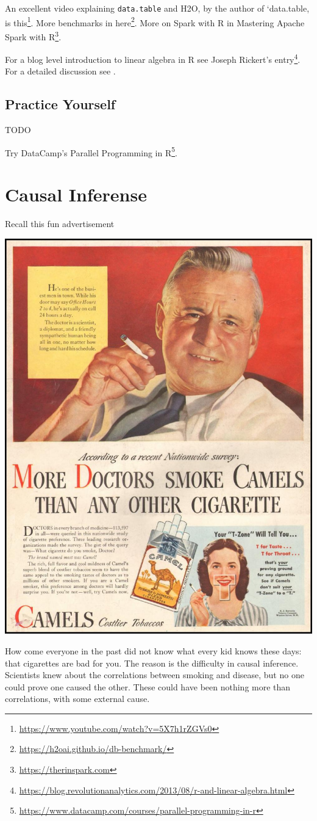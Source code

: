 \documentclass[]{book}
\renewcommand{\href}[2]{#2\footnote{\url{#1}}}
\theoremstyle{definition}
\theoremstyle{definition}
\theoremstyle{definition}
\theoremstyle{remark}
\begin{document}
An excellent video explaining \texttt{data.table} and H2O, by the author of `data.table, is \href{https://www.youtube.com/watch?v=5X7h1rZGVs0}{this}.
More benchmarks in \href{https://h2oai.github.io/db-benchmark/}{here}.
More on Spark with R in \href{https://therinspark.com}{Mastering Apache Spark with R}.

For a blog level introduction to linear algebra in R see \href{https://blog.revolutionanalytics.com/2013/08/r-and-linear-algebra.html}{Joseph Rickert's entry}.
For a detailed discussion see \citet{oancea2015accelerating}.

\hypertarget{practice-yourself-12}{%
\section{Practice Yourself}\label{practice-yourself-12}}

TODO

Try DataCamp's \href{https://www.datacamp.com/courses/parallel-programming-in-r}{Parallel Programming in R}.

\hypertarget{causality}{%
\chapter{Causal Inferense}\label{causality}}

Recall this fun advertisement

\includegraphics[width=0.5\linewidth]{art/wor}

How come everyone in the past did not know what every kid knows these days: that cigarettes are bad for you.
The reason is the difficulty in causal inference.
Scientists knew about the correlations between smoking and disease, but no one could prove one caused the other. These could have been nothing more than correlations, with some external cause.
\end{document}
